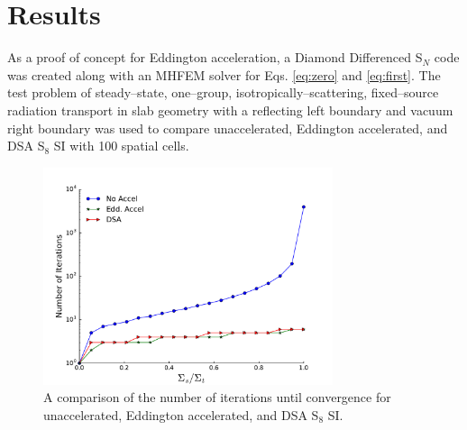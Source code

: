 \documentclass{anstrans}
\newcommand{\SN}{S$_N$\xspace}
\begin{document}


\section{Results}
	As a proof of concept for Eddington acceleration, a Diamond Differenced \SN code was created along with an MHFEM solver for Eqs. \ref{eq:zero} and \ref{eq:first}. The test problem of steady--state, one--group, isotropically--scattering, fixed--source radiation transport in slab geometry with a reflecting left boundary and vacuum right boundary was used to compare unaccelerated, Eddington accelerated, and DSA S$_8$ SI with 100 spatial cells. 

	\begin{figure} %
		\centering
		\includegraphics[width=8.5cm]{accel.pdf}
		\caption{A comparison of the number of iterations until convergence for unaccelerated, Eddington accelerated, and DSA S$_8$ SI. }
		\label{fig:comparison}
	\end{figure}
\end{document}
